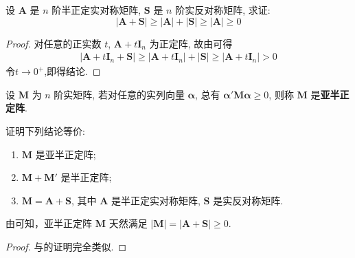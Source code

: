 \documentclass[../../main.tex]{subfiles}%
\begin{document}
\begin{proposition}\label{proposition:半正定阵的行列式的相关的不等式}
设 \(\boldsymbol{A}\) 是 \(n\) 阶半正定实对称矩阵, \(\boldsymbol{S}\) 是 \(n\) 阶实反对称矩阵, 求证:
\[|\boldsymbol{A}+\boldsymbol{S}|\geqslant |\boldsymbol{A}|+|\boldsymbol{S}|\geqslant |\boldsymbol{A}|\geqslant 0\]
\end{proposition}
\begin{proof}
对任意的正实数 \(t\), \(\boldsymbol{A}+t\boldsymbol{I}_n\) 为正定阵, 故由可得
\begin{align*}
|\boldsymbol{A}+t\boldsymbol{I}_n+\boldsymbol{S}|\geqslant |\boldsymbol{A}+t\boldsymbol{I}_n|+|\boldsymbol{S}|\geqslant |\boldsymbol{A}+t\boldsymbol{I}_n|>0
\end{align*}
令\(t\to0^+\),即得结论.
\end{proof}

\begin{definition}[亚半正定]
设 \(\boldsymbol{M}\) 为 \(n\) 阶实矩阵, 若对任意的实列向量 \(\boldsymbol{\alpha}\), 总有 \(\boldsymbol{\alpha}'\boldsymbol{M}\boldsymbol{\alpha}\geqslant 0\), 则称 \(\boldsymbol{M}\) 是\textbf{亚半正定阵}. 
\end{definition}

\begin{theorem}\label{theorem:亚半正定阵的等价条件}
证明下列结论等价:
\begin{enumerate}[(1)]
\item \(\boldsymbol{M}\) 是亚半正定阵;
\item \(\boldsymbol{M}+\boldsymbol{M}'\) 是半正定阵;
\item \(\boldsymbol{M}=\boldsymbol{A}+\boldsymbol{S}\), 其中 \(\boldsymbol{A}\) 是半正定实对称矩阵, \(\boldsymbol{S}\) 是实反对称矩阵.
\end{enumerate} 
\end{theorem}
\begin{remark}
由可知，亚半正定阵 \(\boldsymbol{M}\) 天然满足 \(|\boldsymbol{M}| = |\boldsymbol{A}+\boldsymbol{S}|\geqslant 0\).
\end{remark}
\begin{proof}
与的证明完全类似.
\end{proof}
\end{document}
